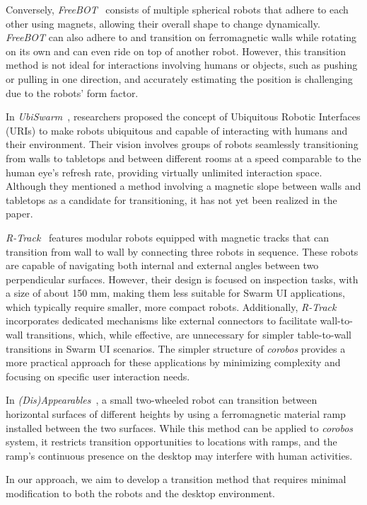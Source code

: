 Conversely, \textit{FreeBOT}~\cite{Liang2020} consists of multiple spherical robots that adhere to each other using magnets, allowing their overall shape to change dynamically.
\textit{FreeBOT} can also adhere to and transition on ferromagnetic walls while rotating on its own and can even ride on top of another robot.
However, this transition method is not ideal for interactions involving humans or objects, such as pushing or pulling in one direction, and accurately estimating the position is challenging due to the robots’ form factor.

In \textit{UbiSwarm}~\cite{UbiSwarm2017}, researchers proposed the concept of Ubiquitous Robotic Interfaces (URIs) to make robots ubiquitous and capable of interacting with humans and their environment.
Their vision involves groups of robots seamlessly transitioning from walls to tabletops and between different rooms at a speed comparable to the human eye’s refresh rate, providing virtually unlimited interaction space.
Although they mentioned a method involving a magnetic slope between walls and tabletops as a candidate for transitioning, it has not yet been realized in the paper.

\textit{R-Track}~\cite{R-Track2021} features modular robots equipped with magnetic tracks that can transition from wall to wall by connecting three robots in sequence.
These robots are capable of navigating both internal and external angles between two perpendicular surfaces.
However, their design is focused on inspection tasks, with a size of about 150 mm, making them less suitable for Swarm UI applications, which typically require smaller, more compact robots.
Additionally, \textit{R-Track} incorporates dedicated mechanisms like external connectors to facilitate wall-to-wall transitions, which, while effective, are unnecessary for simpler table-to-wall transitions in Swarm UI scenarios.
The simpler structure of \textit{corobos} provides a more practical approach for these applications by minimizing complexity and focusing on specific user interaction needs.

In \textit{(Dis)Appearables}~\cite{disappearables2022}, a small two-wheeled robot can transition between horizontal surfaces of different heights by using a ferromagnetic material ramp installed between the two surfaces.
While this method can be applied to \textit{corobos} system, it restricts transition opportunities to locations with ramps, and the ramp’s continuous presence on the desktop may interfere with human activities.

In our approach, we aim to develop a transition method that requires minimal modification to both the robots and the desktop environment.